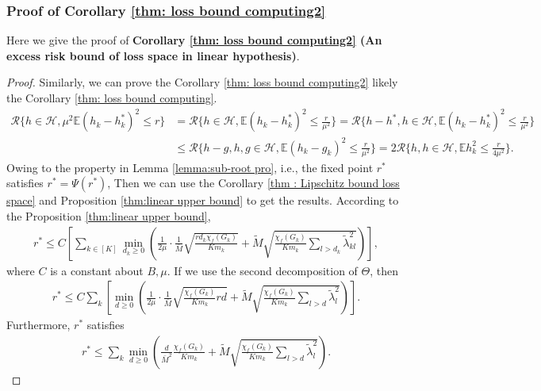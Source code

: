 \documentclass{article}
\def\eE{\mathbb{E}}
\begin{document}
\subsubsection{Proof of Corollary \ref{thm: loss bound computing2}}
\label{pro:corollary6_proof}
Here we give the proof of \textbf{Corollary \ref{thm: loss bound computing2} (An excess risk bound of loss space in linear hypothesis)}.
\begin{proof} 
Similarly, we can prove the Corollary \ref{thm: loss bound computing2} likely the Corollary \ref{thm: loss bound computing}.
\begin{align*}
    \mathcal{R}\{ h \in \mathcal{H}, \mu^2 \eE (h_k - h_k^*)^2 \leq r \} & = \mathcal{R}\{ h \in \mathcal{H}, \eE (h_k - h_k^*)^2 \leq \frac{r}{\mu ^2} \} 
     = \mathcal{R}\{ h-h^*, h \in \mathcal{H}, \eE (h_k - h_k^*)^2 \leq \frac{r}{\mu ^2} \} \\
    & \leq \mathcal{R}\{ h - g, h,g \in \mathcal{H}, \eE (h_k - g_k)^2 \leq \frac{r}{\mu ^2} \} 
     = 2 \mathcal{R}\{ h, h \in \mathcal{H}, \eE h_k ^2 \leq \frac{r}{4 \mu ^2} \}.
\end{align*}
Owing to the property in Lemma \ref{lemma:sub-root pro}, i.e.,  the fixed point $r^*$ satisfies $r^* = \Psi(r^*)$, Then we can use the Corollary \ref{thm : Lipschitz bound loss space} and Proposition \ref{thm:linear upper bound} to get the results. According to the Proposition \ref{thm:linear upper bound}, 
\begin{align*}
    r ^* \leq C \left[ \sum_{k \in [K]} \min _{d_k \geq 0} \left( \frac{1}{2 \mu} \cdot \frac{1}{\bar{M}} \sqrt{\frac{r d_k \chi_f(G_k)}{K m_k}} +\widetilde{M} \sqrt{\frac{\chi_f(G_k)}{K m_k} \sum _{l > d_k} \widetilde{ \lambda} _{kl}^2} \right) \right],
\end{align*}
where $C$ is a constant about $B, \mu$. If we use the second decomposition of $\Theta$, then 
\begin{align*}
    r ^* \leq C \sum_k\left[\min _{d \geq 0} \left( \frac{1}{2 \mu} \cdot \frac{1}{\bar{M}} \sqrt{ \frac{\chi_f(G_k)}{K m_k} r d}+\widetilde{M} \sqrt{ \frac{\chi_f(G_k)}{K m_k} \sum _{l > d} \widetilde{ \lambda} _{l}^2} \right) \right].
\end{align*}
Furthermore, $r^*$ satisfies
\begin{align}
    r^* \leq \sum_k \min _{d \geq 0} \left( \frac{d}{\bar{M}^2} \frac{\chi_f(G_k) }{K m_k} + \widetilde{M} \sqrt{ \frac{\chi_f(G_k)}{K m_k} \sum _{l >d} \widetilde{ \lambda} _{l}^2} \right).
\end{align}
\end{proof}
\end{document}
